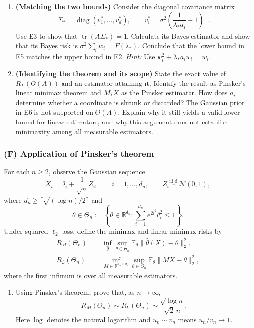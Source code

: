 \begin{enumerate}[label=\textcolor{AccentInk}{\sffamily\bfseries E\arabic*.},ref=E\arabic*,leftmargin=2.65em,labelsep=0.65em,itemsep=1em]
\item \textbf{(Matching the two bounds)} Consider the diagonal covariance matrix
\[
 \Sigma_* =\operatorname{diag}(v_1^*,\ldots,v_d^*),\qquad
 v_i^*=\sigma^2\left(\frac1{\lambda_*a_i}-1\right)_+.
\]
Use E3 to show that $\operatorname{tr}(A\Sigma_*)=1$. Calculate its Bayes estimator and show that its Bayes risk is $\sigma^2\sum_iw_i=F(\lambda_*)$. Conclude that the lower bound in E5 matches the upper bound in E2. \emph{Hint:} Use $w_i^2+\lambda_*a_iw_i=w_i$.

\item \textbf{(Identifying the theorem and its scope)} State the exact value of $R_L(\Theta(A))$ and an estimator attaining it. Identify the result as Pinsker's linear minimax theorem and $M_*X$ as the Pinsker estimator. How does $a_i$ determine whether a coordinate is shrunk or discarded? The Gaussian prior in E6 is not supported on $\Theta(A)$. Explain why it still yields a valid lower bound for linear estimators, and why this argument does not establish minimaxity among all measurable estimators.
\end{enumerate}

\clearpage
\subsubsection*{(F) Application of Pinsker's theorem}
{}
\label{ex:pinsker-application}

For each $n\ge2$, observe the Gaussian sequence
\[
 X_i=\theta_i+\frac1{\sqrt n}Z_i,\qquad i=1,\ldots,d_n,
 \qquad Z_i\overset{\mathrm{i.i.d.}}{\sim}\mathcal N(0,1),
\]
where $d_n\ge\bigl\lceil\sqrt{(\log n)/2}\bigr\rceil$ and
\[
 \theta\in\Theta_n:=\left\{\theta\in\mathbb R^{d_n}:\sum_{i=1}^{d_n}e^{2i^2}\theta_i^2\le1\right\}.
\]
Under squared $\ell_2$ loss, define the minimax and linear minimax risks by
\[
 \begin{aligned}
 R_M(\Theta_n)&=\inf_{\hat\theta}\sup_{\theta\in\Theta_n}
   \mathbb E_\theta\|\hat\theta(X)-\theta\|_2^2,\\
 R_L(\Theta_n)&=\inf_{M\in\mathbb R^{d_n\times d_n}}\sup_{\theta\in\Theta_n}
   \mathbb E_\theta\|MX-\theta\|_2^2,
 \end{aligned}
\]
where the first infimum is over all measurable estimators.

\begin{enumerate}[label=\textcolor{AccentInk}{\sffamily\bfseries F\arabic*.},ref=F\arabic*,leftmargin=2.65em,labelsep=0.65em,itemsep=1em]
\item Using Pinsker's theorem, prove that, as $n\to\infty$,
\[
 R_M(\Theta_n)\sim R_L(\Theta_n)\sim\frac{\sqrt{\log n}}{\sqrt2\,n}.
\]
Here $\log$ denotes the natural logarithm and $u_n\sim v_n$ means $u_n/v_n\to1$.
\end{enumerate}
